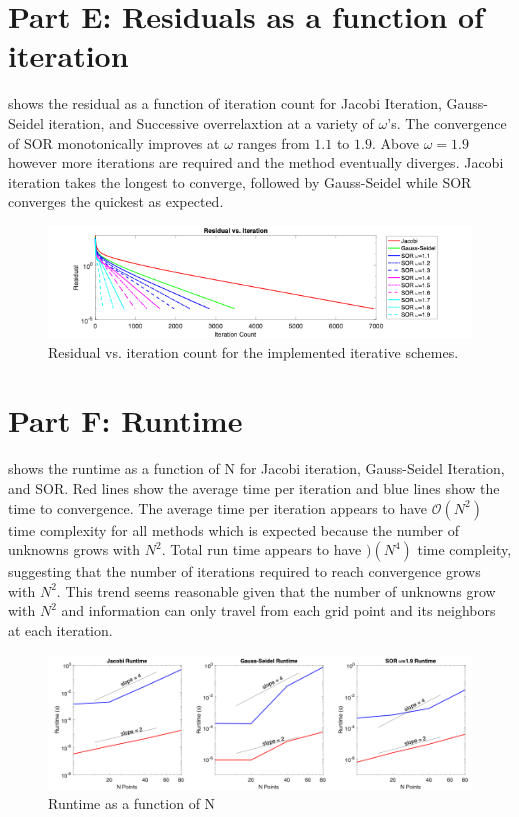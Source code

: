 \documentclass[reqno, 12pt]{amsart}
\begin{document}
    \section{Part E: Residuals as a function of iteration}
    \noindent {} shows the residual as a function of iteration count for Jacobi Iteration, Gauss-Seidel iteration, and Successive overrelaxtion at a variety of $\omega$'s.
    The convergence of SOR monotonically improves at $\omega$ ranges from $1.1$ to $1.9$.
    Above $\omega = 1.9$ however more iterations are required and the method eventually diverges.
    Jacobi iteration takes the longest to converge, followed by Gauss-Seidel while SOR converges the quickest as expected.
    \begin{figure}
        \centering
        \includegraphics[width=\textwidth]{partE.png}
        \caption{Residual vs. iteration count for the implemented iterative schemes.}
        \label{fig:E}
    \end{figure}

    \section{Part F: Runtime}
    \noindent {} shows the runtime as a function of N for Jacobi iteration, Gauss-Seidel Iteration, and SOR.
    Red lines show the average time per iteration and blue lines show the time to convergence.
    The average time per iteration appears to have $\mathcal{O}(N^2)$ time complexity for all methods which is expected because the number of unknowns grows with $N^2$.
    Total run time appears to have $\mathcal{)}(N^4)$ time compleity, suggesting that the number of iterations required to reach convergence grows with $N^2$.
    This trend seems reasonable given that the number of unknowns grow with $N^2$ and information can only travel from each grid point and its neighbors at each iteration.
    \begin{figure}
        \centering
        \includegraphics[width=\textwidth]{partF.png}
        \caption{Runtime as a function of N}
        \label{fig:F}
    \end{figure}
\end{document}
